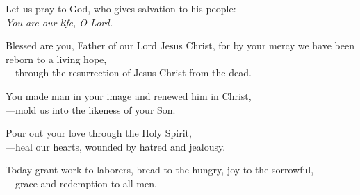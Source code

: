 \intercessions

\begin{raggedright}
Let us pray to God, who gives salvation to his people:\\
\emph{You are our life, O Lord.}

\medskip
Blessed are you, Father of our Lord Jesus Christ, for by your mercy we have been reborn to a living hope,\\
{\color{red}---}through the resurrection of Jesus Christ from the dead.

\medskip
You made man in your image and renewed him in Christ,\\
{\color{red}---}mold us into the likeness of your Son.

\medskip
Pour out your love through the Holy Spirit,\\
{\color{red}---}heal our hearts, wounded by hatred and jealousy.

\medskip
Today grant work to laborers, bread to the hungry, joy to the sorrowful,\\
{\color{red}---}grace and redemption to all men.
\end{raggedright}